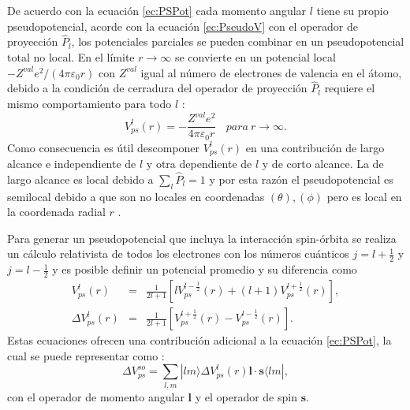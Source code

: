    \par De acuerdo con la ecuaci\'on \ref{ec:PSPot} cada momento angular $l$ tiene su propio pseudopotencial,  acorde con la ecuaci\'on \ref{ec:PseudoV} con el operador de proyecci\'on $\hat{P}_l$, los potenciales parciales se pueden combinar en un pseudopotencial total no local. En el l\'imite $r \rightarrow \infty$ se convierte en un potencial local $- Z^{val} e^2 / (4 \pi \varepsilon_0 r)$ con $Z^{val}$ igual al n\'umero de electrones de valencia en el \'atomo, debido a la condici\'on de cerradura del operador de proyecci\'on $\hat{P}_l$ requiere el mismo comportamiento para todo $l$ \cite{MB-2015}:
   \begin{equation}
   V_{ps}^l (r)= - \frac{Z^{val} e^2}{4 \pi \varepsilon_0 r} ~~~~para ~ r \rightarrow \infty.
   \end{equation}
   Como consecuencia es \'util descomponer $V_{ps}^l (r)$ en una contribuci\'on de largo alcance e independiente de $l$ y otra dependiente de $l$ y de corto alcance. La de largo alcance es local debido a $\sum_l \hat{P}_l =1$ y por esta raz\'on el pseudopotencial es semilocal debido a que son no locales en coordenadas $(\theta), (\phi)$ pero es local en la coordenada radial $r$ \cite{Martin-2004}.
   \newline
   \par Para generar un pseudopotencial que incluya la interacci\'on spin-\'orbita se realiza un c\'alculo relativista de todos los electrones con los  n\'umeros cu\'anticos $j=l+\frac{1}{2}$ y $j=l-\frac{1}{2}$ y es posible definir un potencial promedio y su diferencia como \cite{PhysRevB.26.4199, pickett_1989}
   \begin{eqnarray}
   V_{ps}^l (r) &=& \frac{1}{2 l +1} \left[l V_{ps}^{l-\frac{1}{2}} (r) + (l+1) V_{ps}^{l+\frac{1}{2}} (r)  \right], \\
   \Delta V_{ps}^l (r) &=& \frac{1}{2 l +1} \left[V_{ps}^{l+\frac{1}{2}} (r) -  V_{ps}^{l-\frac{1}{2}} (r)  \right].
   \end{eqnarray} 
   Estas ecuaciones ofrecen una contribuci\'on adicional a la ecuaci\'on  \ref{ec:PSPot}, la cual se puede representar como \cite{PhysRevB.34.2920, PhysRevB.64.073106}:
   \begin{equation}
   \Delta V_{ps}^{so} = \sum_{l,m} |lm \rangle \Delta V_{ps}^{l} (r)  \pmb{l} \cdot \pmb{s} \langle lm| \label{ec:psudoSO},
   \end{equation}
   con el operador de momento angular $\pmb{l} $ y el operador de spin $\pmb{s}$.
